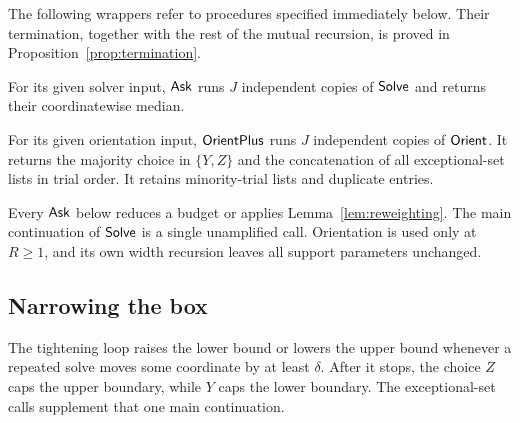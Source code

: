 The following wrappers refer to procedures specified immediately below.
Their termination, together with the rest of the mutual recursion, is
proved in Proposition~\ref{prop:termination}.

\begin{procedure}\label{proc:ask}
For its given solver input, $\mathsf{Ask}$ runs $J$ independent copies of
$\mathsf{Solve}$ and returns their coordinatewise median.
\end{procedure}

\begin{procedure}\label{proc:orient-plus}
For its given orientation input, $\mathsf{OrientPlus}$ runs $J$ independent
copies of $\mathsf{Orient}$. It returns the majority choice in $\{Y,Z\}$
and the concatenation of all exceptional-set lists in trial order.
It retains minority-trial lists and duplicate entries.
\end{procedure}

Every $\mathsf{Ask}$ below reduces a budget or applies
Lemma~\ref{lem:reweighting}. The main continuation of $\mathsf{Solve}$ is
a single unamplified call. Orientation is used only at $R\ge1$, and
its own width recursion leaves all support parameters unchanged.

\subsection{Narrowing the box}

The tightening loop raises the lower bound or lowers the upper bound
whenever a repeated solve moves some coordinate by at least $\delta$.
After it stops, the choice $Z$ caps the upper boundary, while $Y$ caps
the lower boundary. The exceptional-set calls supplement that one
main continuation.

